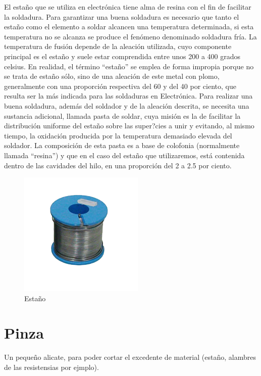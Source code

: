 El estaño que se utiliza en electrónica tiene alma de resina con el fin de facilitar la soldadura. 
Para garantizar una buena soldadura es necesario que tanto el estaño como el elemento a soldar alcancen una temperatura determinada, si esta temperatura no se alcanza se produce el fenómeno denominado soldadura fría. La temperatura de fusión depende de la aleación utilizada, cuyo componente principal es el estaño y suele estar comprendida entre unos 200 a 400 grados celsius.
En realidad, el término “estaño” se emplea de forma impropia porque no se trata de estaño sólo, sino de una aleación de este metal con plomo, generalmente con una proporción respectiva del 60 y del 40 por ciento, que resulta ser la más indicada para las soldaduras en Electrónica. 
Para realizar una buena soldadura, además del soldador y de la aleación descrita, se necesita una sustancia adicional, llamada pasta de soldar, cuya misión es la de facilitar la distribución uniforme del estaño sobre las super?cies a unir y evitando, al mismo tiempo, la oxidación producida por la temperatura demasiado elevada del soldador.
La composición de esta pasta es a base de colofonia (normalmente llamada “resina”) y que en el caso del estaño que utilizaremos, está contenida dentro de las cavidades del hilo, en una proporción del 2 a 2.5 por ciento.

\begin{figure}[h]
	\centering
	\includegraphics[width=0.5\linewidth]{herramientas/estanio}
	\caption{Estaño}
	\label{fig:estanio}
\end{figure}

\newpage

\section{Pinza}

Un pequeño alicate, para poder cortar el excedente de material (estaño, alambres de las resistensias por ejmplo).

